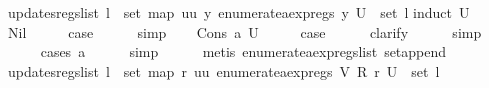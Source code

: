 \begin{isabellebody}
\isamarkupfalse%
%
\endisatagproof
{\isafoldproof}%
%
\isadelimproof
\isanewline
%
\endisadelimproof
\isanewline
{}\isamarkupfalse%
\ updates{\isacharunderscore}regs{\isacharunderscore}list{\isacharunderscore}{}{\isacharcolon}\ {\isachardoublequoteopen}{\isasymexists}l{\isachardot}\ {\isasymUnion}\ {\isacharparenleft}set\ {\isacharparenleft}map\ {\isacharparenleft}{\isasymlambda}{\isacharparenleft}uu{\isacharcomma}\ y{\isacharparenright}{\isachardot}\ enumerate{\isacharunderscore}aexp{\isacharunderscore}regs\ y{\isacharparenright}\ U{\isacharparenright}{\isacharparenright}\ {\isacharequal}\ set\ l{\isachardoublequoteclose}\isanewline
%
\isadelimproof
%
\endisadelimproof
%
\isatagproof
{}\isamarkupfalse%
{\isacharparenleft}induct\ U{\isacharparenright}\isanewline
\ \ \isamarkupfalse%
\ Nil\isanewline
\ \ \isamarkupfalse%
\ \isamarkupfalse%
\ {\isacharquery}case\isanewline
\ \ \ \ \isamarkupfalse%
\ simp\isanewline
{}\isamarkupfalse%
\isanewline
\ \ \isamarkupfalse%
\ {\isacharparenleft}Cons\ a\ U{\isacharparenright}\isanewline
\ \ \isamarkupfalse%
\ \isamarkupfalse%
\ {\isacharquery}case\isanewline
\ \ \ \ \isamarkupfalse%
\ clarify\isanewline
\ \ \ \ \isamarkupfalse%
\ simp\isanewline
\ \ \ \ \isamarkupfalse%
\ {\isacharparenleft}cases\ a{\isacharparenright}\isanewline
\ \ \ \ \isamarkupfalse%
\ simp\isanewline
\ \ \ \ \isamarkupfalse%
\ {\isacharparenleft}metis\ enumerate{\isacharunderscore}aexp{\isacharunderscore}regs{\isacharunderscore}list\ set{\isacharunderscore}append{\isacharparenright}\isanewline
{}\isamarkupfalse%
%
\endisatagproof
{\isafoldproof}%
%
\isadelimproof
\isanewline
%
\endisadelimproof
\isanewline
{}\isamarkupfalse%
\ updates{\isacharunderscore}regs{\isacharunderscore}list{\isacharunderscore}{}{\isacharcolon}\ {\isachardoublequoteopen}{\isasymexists}l{\isachardot}\ {\isasymUnion}\ {\isacharparenleft}set\ {\isacharparenleft}map\ {\isacharparenleft}{\isasymlambda}{\isacharparenleft}r{\isacharcomma}\ uu{\isacharparenright}{\isachardot}\ enumerate{\isacharunderscore}aexp{\isacharunderscore}regs\ {\isacharparenleft}V\ {\isacharparenleft}R\ r{\isacharparenright}{\isacharparenright}{\isacharparenright}\ U{\isacharparenright}{\isacharparenright}\ {\isacharequal}\ set\ l{\isachardoublequoteclose}\isanewline
%
\isadelimproof
%
\endisadelimproof

\end{isabellebody}
